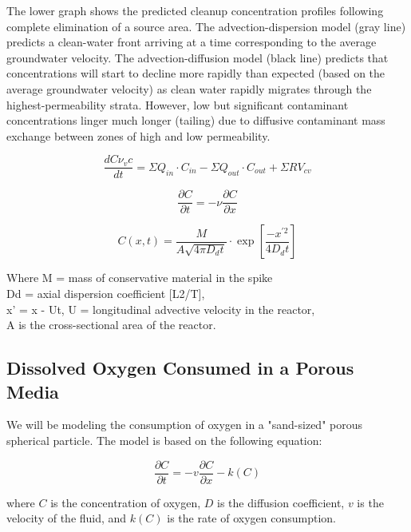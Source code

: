 \documentclass{tufte-handout}\usepackage[]{graphicx}\usepackage[]{xcolor}
\begin{document}
The lower graph shows the predicted cleanup concentration profiles following complete elimination of a source area. The advection-dispersion model (gray line) predicts a clean-water front arriving at a time corresponding to the average groundwater velocity. The advection-diffusion model (black line) predicts that concentrations will start to decline more rapidly than expected (based on the average groundwater velocity) as clean water rapidly migrates through the highest-permeability strata. However, low but significant contaminant concentrations linger much longer (tailing) due to diffusive contaminant mass exchange between zones of high and low permeability.

\begin{equation}
\frac{d C\nu_vc}{d t} = \Sigma Q_{in} \cdot C_{in} - \Sigma Q_{out} \cdot C_{out} + \Sigma R V_{cv}
\end{equation}


\begin{equation}
  \frac{\partial C}{\partial t} = - \nu \frac{\partial C}{\partial x}
\end{equation}

\begin{equation}
C(x,t) = \frac{M}{A \sqrt{4\pi D_d t}} \cdot \exp[\frac{−x^{\prime 2}}{4D_d t}]
\end{equation}

Where
M = mass of conservative material in the spike\\
Dd = axial dispersion coefficient [L2/T],\\
x’ = x - Ut, U = longitudinal advective velocity in the reactor,\\
A is the cross-sectional area of the reactor.\\


\subsection{Dissolved Oxygen Consumed in a Porous Media}

We will be modeling the consumption of oxygen in a "sand-sized" porous spherical particle. The model is based on the following equation:

\[ \frac{\partial C}{\partial t} = -v \frac{\partial C}{\partial x} - k(C) \]

where \( C \) is the concentration of oxygen, \( D \) is the diffusion coefficient, \( v \) is the velocity of the fluid, and \( k(C) \) is the rate of oxygen consumption.
\end{document}
